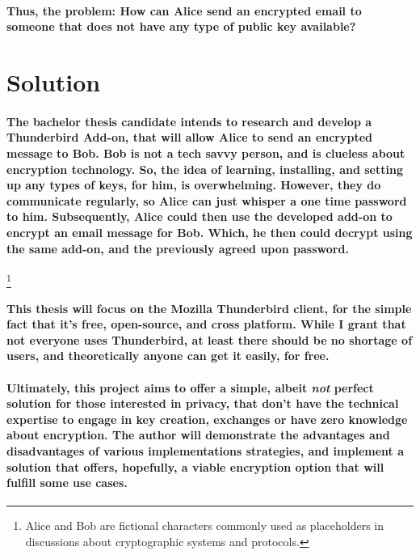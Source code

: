 \paragraph{Thus, the problem: How can Alice send an encrypted email to someone that does not have any type of public key available?}

\section{Solution}

\paragraph{The bachelor thesis candidate intends to research and develop a Thunderbird Add-on, that will allow Alice to send an encrypted message to Bob. Bob is not a tech savvy person, and is clueless about encryption technology. So, the idea of learning, installing, and setting up any types of keys, for him, is overwhelming. However, they do communicate regularly, so Alice can just whisper a one time password to him. Subsequently, Alice could then use the developed add-on to encrypt an email message for Bob. Which, he then could decrypt using the same add-on, and the previously agreed upon password.}\footnote{Alice and Bob are fictional characters commonly used as placeholders in discussions about cryptographic systems and protocols.}

\paragraph{This thesis will focus on the Mozilla Thunderbird client, for the simple fact that it's free, open-source, and cross platform. While I grant that not everyone uses Thunderbird, at least there should be no shortage of users, and theoretically anyone can get it easily, for free.}

\paragraph{Ultimately, this project aims to offer a simple, albeit \emph{not} perfect solution for those interested in privacy, that don't have the technical expertise to engage in key creation, exchanges or have zero knowledge about encryption. The author will demonstrate the advantages and disadvantages of various implementations strategies, and implement a solution that offers, hopefully, a viable encryption option that will fulfill some use cases.}

